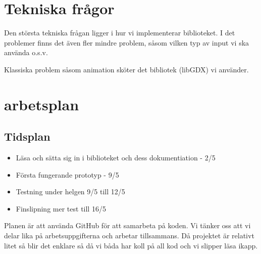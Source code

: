 \documentclass[a4paper,11pt]{article}
\begin{document}
\section{Tekniska frågor}
Den största tekniska frågan ligger i hur vi implementerar biblioteket. I det problemer finns det även fler mindre problem, såsom vilken typ av input vi ska använda o.s.v. 

Klassiska problem såsom animation sköter det bibliotek (libGDX) vi använder.

\section{arbetsplan}
\subsection{Tidsplan}
\begin{itemize}
\item Läsa och sätta sig in i biblioteket och dess dokumentiation - 2/5
\item Första fungerande prototyp - 9/5
\item Testning under helgen 9/5 till 12/5
\item Finslipning mer test till 16/5
\end{itemize}

Planen är att använda GitHub för att samarbeta på koden. Vi tänker oss att vi delar lika på arbetsuppgifterna och arbetar tillsammans. Då projektet är relativt litet så blir det enklare så då vi båda har koll på all kod och vi slipper läsa ikapp.
\end{document}
